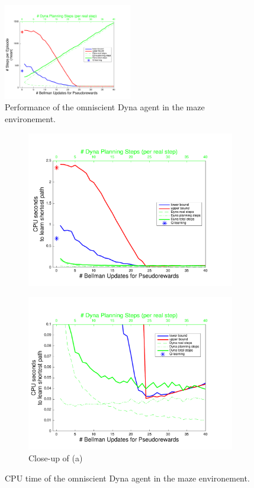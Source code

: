 \documentclass[letterpaper]{article}
\begin{document}
\begin{figure}[ht]
\centering
\includegraphics[width=0.5\textwidth]{learning_vs_PRiterations_omniscientDYNA_mean}
\caption{Performance of the omniscient Dyna agent in the maze environement.}
\label{fig:S1a}
\end{figure}

\begin{figure}
\centering
\begin{subfigure}{.4\textwidth}
  \centering
  \includegraphics[width=.95\linewidth]{cpus_vs_PRiterations_omniscientDYNA_toGoal}
  \caption{}
\end{subfigure}
\begin{subfigure}{.4\textwidth}
  \centering
  \includegraphics[width=.95\linewidth]{cpus_vs_PRiterations_omniscientDYNA_toGoal_closeup}
  \caption{Close-up of (a)}
\end{subfigure}
\caption{CPU time of the omniscient Dyna agent in the maze environement.}
\label{fig:S1b}
\end{figure}
\end{document}
